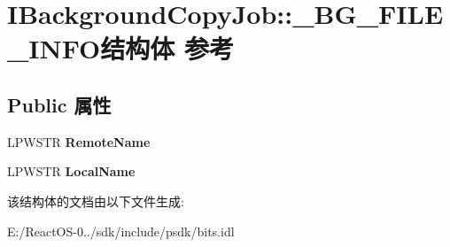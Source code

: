 \hypertarget{struct_i_background_copy_job_1_1___b_g___f_i_l_e___i_n_f_o}{}\section{I\+Background\+Copy\+Job\+:\+:\+\_\+\+B\+G\+\_\+\+F\+I\+L\+E\+\_\+\+I\+N\+F\+O结构体 参考}
\label{struct_i_background_copy_job_1_1___b_g___f_i_l_e___i_n_f_o}
\subsection*{Public 属性}
\begin{DoxyCompactItemize}
\item 
\mbox{\label{struct_i_background_copy_job_1_1___b_g___f_i_l_e___i_n_f_o_a3949dce92772316b2ab37d721caa9746}} 
L\+P\+W\+S\+TR {\bfseries Remote\+Name}
\item 
\mbox{\label{struct_i_background_copy_job_1_1___b_g___f_i_l_e___i_n_f_o_aae5359546fd7e6a9ece12df454ea5af9}} 
L\+P\+W\+S\+TR {\bfseries Local\+Name}
\end{DoxyCompactItemize}


该结构体的文档由以下文件生成\+:\begin{DoxyCompactItemize}
\item 
E\+:/\+React\+O\+S-\/0../sdk/include/psdk/bits.\+idl\end{DoxyCompactItemize}
